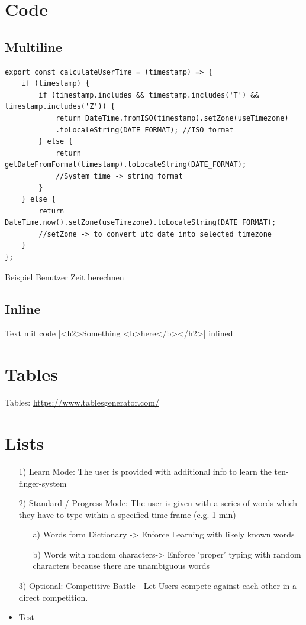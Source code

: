 \section{Code}
\subsection{Multiline}
\begin{longlisting}
\begin{verbatim}
export const calculateUserTime = (timestamp) => {
    if (timestamp) {
        if (timestamp.includes && timestamp.includes('T') && timestamp.includes('Z')) {
            return DateTime.fromISO(timestamp).setZone(useTimezone)
            .toLocaleString(DATE_FORMAT); //ISO format
        } else {
            return getDateFromFormat(timestamp).toLocaleString(DATE_FORMAT); 
            //System time -> string format
        }
    } else {
        return DateTime.now().setZone(useTimezone).toLocaleString(DATE_FORMAT); 
        //setZone -> to convert utc date into selected timezone
    }
};
\end{verbatim}
\caption{Beispiel Benutzer Zeit berechnen}
\label{lst:jetpack-compose-example}
\end{longlisting}

\subsection{Inline}
Text mit code |<h2>Something <b>here</b></h2>| inlined

\section{Tables}
Tables:
\url{https://www.tablesgenerator.com/}


\section{Lists}
\begin{itemize}
    \item[1)] Learn Mode: The user is provided with additional info to learn the ten-finger-system
    \item[2)] Standard / Progress Mode: The user is given with a series of words which they have to type within a specified time frame (e.g. 1 min)
    \begin{itemize}
        \item[a)] Words form Dictionary -> Enforce Learning with likely known words
        \item[b)] Words with random characters-> Enforce 'proper' typing with random characters because there are unambiguous words
    \end{itemize}
    \item[3)] Optional: Competitive Battle - Let Users compete against each other in a direct competition.
    \item Test
\end{itemize}

